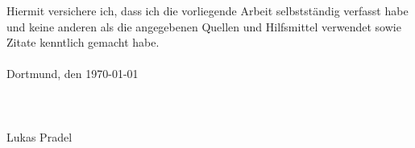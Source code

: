 Hiermit versichere ich, dass ich die vorliegende Arbeit selbstständig verfasst habe und keine
anderen als die angegebenen Quellen und Hilfsmittel verwendet sowie Zitate kenntlich gemacht habe.\\\\
Dortmund, den \today \\\\\\\\
Lukas Pradel